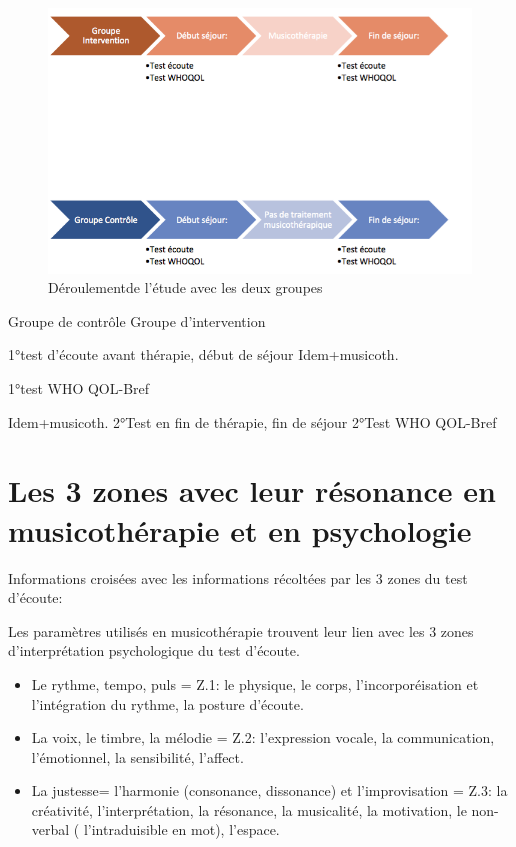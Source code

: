         \begin{figure}
	\centering
	\includegraphics[width=0.7\linewidth]{images/Groupecontrole.png}
	\caption[Schéma du déroulement]{Déroulementde l'étude avec les
          deux groupes}
       
	\label{groupecontroleimage1}
\end{figure}



        
        Groupe de contrôle                                                    Groupe
                                                                                     d'intervention

1°test d'écoute avant thérapie, début de séjour           Idem+musicoth.

1°test WHO QOL-Bref

                                                                                     Idem+musicoth.
2°Test en fin de thérapie, fin de séjour
2°Test WHO QOL-Bref
 



\section{Les 3 zones avec leur résonance en musicothérapie et en
  psychologie}


	Informations croisées avec les informations récoltées par les 3 
          zones du test d'écoute:
          
Les paramètres utilisés en musicothérapie trouvent leur lien avec les
3 zones d'interprétation psychologique du test d'écoute.
\begin{itemize}
 \item Le rythme, tempo, puls  =  Z.1: le physique, le corps, l'incorporéisation et
l'intégration du rythme,
la posture d'écoute.

\item La voix, le timbre, la mélodie =  Z.2:  l'expression vocale, la communication,
l'émotionnel, la sensibilité, l'affect.

\item La justesse= l'harmonie (consonance, dissonance) et l'improvisation = Z.3:  la créativité, l'interprétation, la
résonance, la musicalité, la motivation, le non-verbal (
l'intraduisible en mot), l'espace.
\end{itemize}

